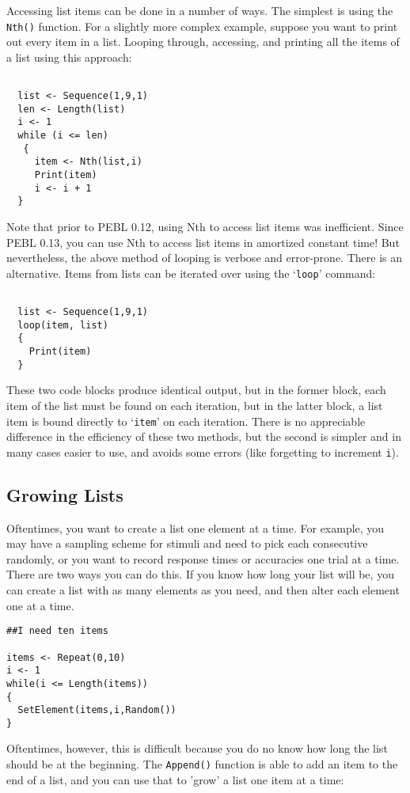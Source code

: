Accessing list items can be done in a number of ways.  The simplest is using the \verb+Nth()+ function.
For a slightly more complex example, suppose you want to print out every item in a list. Looping through, accessing, and printing all the items of a list using this approach: 
\begin{verbatim}

  list <- Sequence(1,9,1) 
  len <- Length(list)
  i <- 1
  while (i <= len)
   {
     item <- Nth(list,i) 
     Print(item)
     i <- i + 1
  } 

\end{verbatim}
Note that prior to PEBL 0.12, using Nth to access list items was inefficient.  Since PEBL 0.13, you can use Nth to access list items in amortized constant time!  But nevertheless, the above method of looping is verbose and error-prone.  There is an alternative.  Items from
lists can be iterated over using the `\texttt{loop}' command:  
\begin{verbatim}

  list <- Sequence(1,9,1)
  loop(item, list) 
  {
    Print(item)
  }
\end{verbatim}

These two code blocks produce identical output, but in the former
block, each item of the list must be found on each iteration, but in
the latter block, a list item is bound directly to `\texttt{item}' on
each iteration.  There is no appreciable difference in the efficiency
of these two methods, but the second is simpler and in many cases
easier to use, and avoids some errors (like forgetting to increment
\texttt{i}).

\subsection{Growing Lists}
Oftentimes, you want to create a list one element at a time.  For example, you may have a sampling scheme for stimuli and need to pick each consecutive randomly, or you want to record response times or accuracies one trial at a time.  There are two ways you can do this.  If you know how long your list will be, you can create a list with as many elements as you need, and then alter each element one at a time.  
\begin{verbatim}
##I need ten items

items <- Repeat(0,10)
i <- 1
while(i <= Length(items))
{
  SetElement(items,i,Random())
}
\end{verbatim}

Oftentimes, however, this is difficult because you do no know how long the list should be at the beginning.  The \verb+Append()+ function is able to add an item to the end of a list, and you can use that to 'grow' a list one item at a time:

